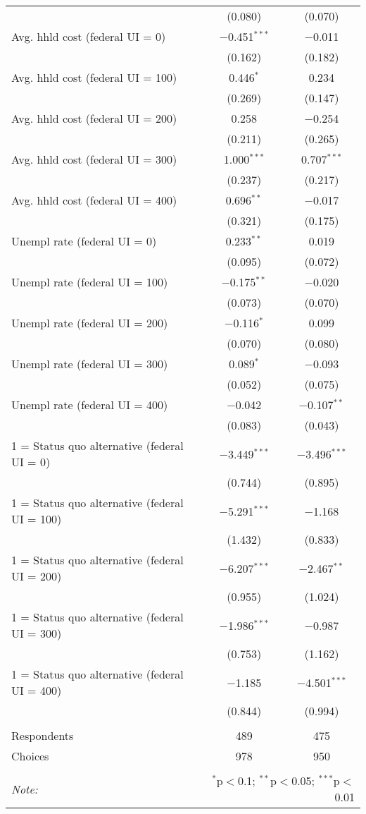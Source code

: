 \begin{table}[!htbp]
\begin{tabular}{@{\extracolsep{5pt}}lcc}
  & (0.080) & (0.070) \\ 
  Avg. hhld cost (federal UI = 0) & $-$0.451$^{***}$ & $-$0.011 \\ 
  & (0.162) & (0.182) \\ 
  Avg. hhld cost (federal UI = 100) & 0.446$^{*}$ & 0.234 \\ 
  & (0.269) & (0.147) \\ 
  Avg. hhld cost (federal UI = 200) & 0.258 & $-$0.254 \\ 
  & (0.211) & (0.265) \\ 
  Avg. hhld cost (federal UI = 300) & 1.000$^{***}$ & 0.707$^{***}$ \\ 
  & (0.237) & (0.217) \\ 
  Avg. hhld cost (federal UI = 400) & 0.696$^{**}$ & $-$0.017 \\ 
  & (0.321) & (0.175) \\ 
  Unempl rate (federal UI = 0) & 0.233$^{**}$ & 0.019 \\ 
  & (0.095) & (0.072) \\ 
  Unempl rate (federal UI = 100) & $-$0.175$^{**}$ & $-$0.020 \\ 
  & (0.073) & (0.070) \\ 
  Unempl rate (federal UI = 200) & $-$0.116$^{*}$ & 0.099 \\ 
  & (0.070) & (0.080) \\ 
  Unempl rate (federal UI = 300) & 0.089$^{*}$ & $-$0.093 \\ 
  & (0.052) & (0.075) \\ 
  Unempl rate (federal UI = 400) & $-$0.042 & $-$0.107$^{**}$ \\ 
  & (0.083) & (0.043) \\ 
  1 = Status quo alternative (federal UI = 0) & $-$3.449$^{***}$ & $-$3.496$^{***}$ \\ 
  & (0.744) & (0.895) \\ 
  1 = Status quo alternative (federal UI = 100) & $-$5.291$^{***}$ & $-$1.168 \\ 
  & (1.432) & (0.833) \\ 
  1 = Status quo alternative (federal UI = 200) & $-$6.207$^{***}$ & $-$2.467$^{**}$ \\ 
  & (0.955) & (1.024) \\ 
  1 = Status quo alternative (federal UI = 300) & $-$1.986$^{***}$ & $-$0.987 \\ 
  & (0.753) & (1.162) \\ 
  1 = Status quo alternative (federal UI = 400) & $-$1.185 & $-$4.501$^{***}$ \\ 
  & (0.844) & (0.994) \\ 
 \hline \\[-1.8ex] 
Respondents & 489 & 475\\ 
 Choices & 978 & 950\\ 
\hline 
\hline \\[-1.8ex] 
\textit{Note:}  & \multicolumn{2}{r}{$^{*}$p$<$0.1; $^{**}$p$<$0.05; $^{***}$p$<$0.01} \\ 
\end{tabular} 
\end{table} 
